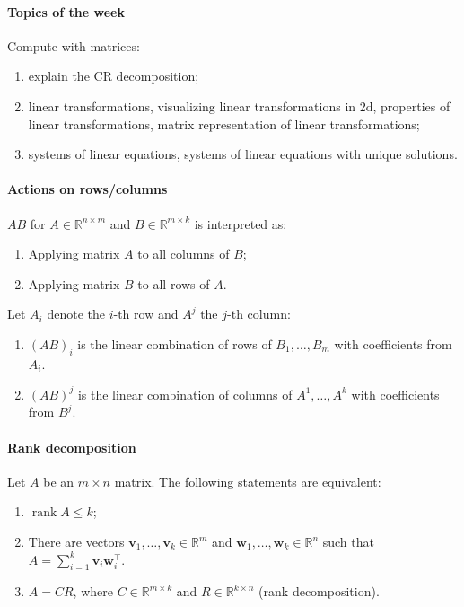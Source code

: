 \documentclass{article}
\begin{document}
\paragraph{Topics of the week} Compute with matrices:  

\begin{enumerate}
    \item explain the CR decomposition;
    \item  linear transformations, visualizing linear transformations in 2d, properties of linear transformations, matrix representation of linear transformations;
    \item systems of linear equations, systems of linear equations with unique solutions.
\end{enumerate}

\paragraph{Actions on rows/columns} $AB$ for $A \in \mathbb R^{n \times m}$ and $B \in \mathbb R^{m \times k}$ is interpreted as:

\begin{enumerate}
    \item Applying matrix $A$ to all columns of $B$;
    \item Applying matrix $B$ to all rows of $A$.
\end{enumerate}

Let $A_i$ denote the $i$-th row and $A^j$ the $j$-th column:

\begin{enumerate}
    \item $(AB)_i$ is the linear combination of rows of $B_1,\dots,B_m$ with coefficients from $A_i$.
    \item $(AB)^j$ is the linear combination of columns of $A^1,\dots,A^k$ with coefficients from $B^j$.
\end{enumerate}

\paragraph{Rank decomposition} Let $A$ be an $m \times n$ matrix. The following statements are equivalent:
\begin{enumerate}
    \item $\operatorname{rank} A \leq k$;
    \item There are vectors $\mathbf{v}_1,\dots,\mathbf{v}_k \in \mathbb R^m$ and $\mathbf{w}_1,\dots,\mathbf{w}_k \in \mathbb R^n$ such that $A = \sum\limits_{i=1}^k \mathbf{v}_i \mathbf{w}_i^\top$.
    \item $A = CR$, where $C \in \mathbb R^{m \times k}$ and $R \in \mathbb R^{k \times n}$ (rank decomposition).
\end{enumerate}
\end{document}
